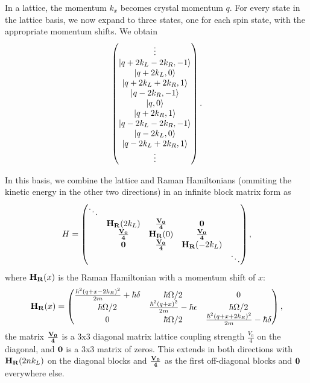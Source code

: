 In a lattice, the momentum $k_x$ becomes crystal momentum $q$. For every state in the lattice basis, we now expand to three states, one for each spin state, with the appropriate momentum shifts. We obtain
\begin{equation}
 \begin{pmatrix} \vdots \\
\mathinner{|{q+2k_L-2k_R,-1}\rangle}\\
 \mathinner{|{q+2k_L,0}\rangle}\\
\mathinner{|{q+2k_L+2k_R,1}\rangle}\\
\mathinner{|{q-2k_R,-1}\rangle}\\
 \mathinner{|{q,0}\rangle}\\
\mathinner{|{q+2k_R,1}\rangle}\\
\mathinner{|{q-2k_L-2k_R,-1}\rangle}\\
 \mathinner{|{q-2k_L,0}\rangle}\\
\mathinner{|{q-2k_L+2k_R,1}\rangle}\\
\vdots
\end{pmatrix} \\.
\end{equation}

In this basis, we combine the lattice and Raman Hamiltonians (ommiting the kinetic energy in the other two directions) in an infinite block matrix form as 
\begin{equation}
H =
 \begin{pmatrix} \ddots &  & & & \\ 
 &{\bf H_R}(2k_L)  & {\bf \frac{V_0}{4}} &{\bf 0} &  \\
 &  {\bf \frac{V_0}{4}} &{\bf H_R}(0) & {\bf \frac{V_0}{4}}&  \\
 & {\bf 0} &  {\bf \frac{V_0}{4}} & {\bf H_R}(-2k_L)  &  \\
 & & & &  \ddots \end{pmatrix} \\,
\label{eqn:LatHam}
\end{equation}
where ${\bf H_R}(x)$ is the Raman Hamiltonian with a momentum shift of $x$:
 \begin{equation}
{\bf H_R}(x) = 
 \begin{pmatrix} \frac{\hbar^2(q + x -2k_R)^2}{2m}+\hbar\delta & \hbar\Omega/2  &  0  \\ 
\hbar\Omega/2 & \frac{\hbar^2 (q+x)^2}{2m} - \hbar\epsilon &  \hbar\Omega/2\\
 0 & \hbar\Omega/2 &  \frac{\hbar^2(q+x+2k_R)^2}{2m} -\hbar\delta  \\
 \end{pmatrix} \\,
\end{equation}
the matrix ${\bf \frac{V_0}{4}}$ is a 3x3 diagonal matrix lattice coupling strength $\frac{V_0}{4}$ on the diagonal, and $\bf 0$ is a 3x3 matrix of zeros. This extends in both directions with ${\bf H_R}(2nk_L)$ on the diagonal blocks and ${\bf \frac{V_0}{4}}$ as the first off-diagonal blocks and $\bf 0$ everywhere else. 

